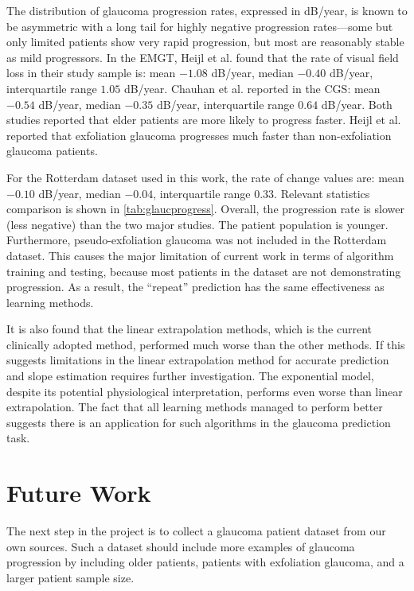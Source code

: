 The distribution of glaucoma progression rates, expressed in dB/year, is known to be asymmetric with a long tail for highly negative progression rates---some but only limited patients show very rapid progression, but most are reasonably stable as mild progressors. \cite{Anderson2015} In the \ac{EMGT}, Heijl et al. found that the rate of visual field loss in their study sample is: mean $-1.08$ dB/year, median $-0.40$ dB/year, interquartile range $1.05$ dB/year. \cite{Heijl2009} Chauhan et al. reported in the \ac{CGS}: mean $-0.54$ dB/year, median $-0.35$ dB/year, interquartile range $0.64$ dB/year. \cite{Group2010} Both studies reported that elder patients are more likely to progress faster. Heijl et al. reported that exfoliation glaucoma progresses much faster than non-exfoliation glaucoma patients. 

For the Rotterdam dataset used in this work, the rate of change values are: mean $-0.10$ dB/year, median $-0.04$, interquartile range $0.33$. Relevant statistics comparison is shown in \cref{tab:glaucprogress}. Overall, the progression rate is slower (less negative) than the two major studies. The patient population is younger. Furthermore, pseudo-exfoliation glaucoma was not included in the Rotterdam dataset. This causes the major limitation of current work in terms of algorithm training and testing, because most patients in the dataset are not demonstrating progression. As a result, the ``repeat'' prediction has the same effectiveness as learning methods. 

It is also found that the linear extrapolation methods, which is the current clinically adopted method, performed much worse than the other methods. If this suggests limitations in the linear extrapolation method for accurate prediction and slope estimation requires further investigation. The exponential model, despite its potential physiological interpretation, performs even worse than linear extrapolation. The fact that all learning methods managed to perform better suggests there is an application for such algorithms in the glaucoma prediction task. 

\section{Future Work}

The next step in the project is to collect a glaucoma patient dataset from our own sources. Such a dataset should include more examples of glaucoma progression by including older patients, patients with exfoliation glaucoma, and a larger patient sample size. 

